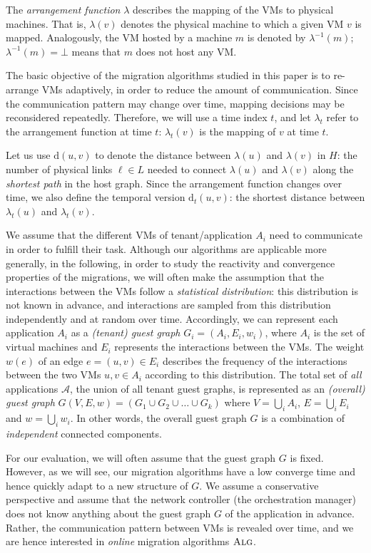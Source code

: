 \documentclass[conference]{IEEEtran}
\newcommand{\dist}{\text{d}}
\begin{document}
The \emph{arrangement function} $\lambda$ describes the mapping of the VMs to physical machines. That is, $\lambda(v)$ denotes the physical machine to which a given VM $v$ is mapped. Analogously, the VM hosted by a machine $m$ is denoted by $\lambda^{-1}(m)$; $\lambda^{-1}(m)=\bot$ means that $m$ does not host any VM.

The basic objective of the migration algorithms studied in this paper is to re-arrange VMs adaptively, in order to reduce the amount of communication. Since the communication pattern may change over time, mapping decisions may be reconsidered repeatedly. Therefore, we will use a time index $t$, and let $\lambda_{t}$ refer to the arrangement function at time $t$: $\lambda_t(v)$ is the mapping of $v$ at time $t$.

Let us use $\dist(u,v)$ to denote the distance between $\lambda(u)$ and $\lambda(v)$ in $H$: the number of physical links $\ell \in L$ needed to connect $\lambda(u)$ and $\lambda(v)$ along the \emph{shortest path} in the host graph. Since the arrangement function changes over time, we also define the temporal version $\dist_{t}(u,v)$: the shortest distance between $\lambda_{t}(u)$ and $\lambda_{t}(v)$.

We assume that the different VMs of tenant/application $A_{i}$ need to communicate in order to fulfill their task. Although our algorithms
are applicable more generally, in the following, in order to study the reactivity and convergence properties of the migrations,
we will often make the assumption that the interactions between the VMs follow a \emph{statistical distribution}:
this distribution is not known in advance, and interactions are sampled from this distribution independently and at random over time.
Accordingly, we can represent each application $A_{i}$ as a \emph{(tenant) guest graph} $G_{i}=(A_{i},E_{i},w_{i})$,
where $A_{i}$ is the set of virtual machines and
$E_i$ represents the interactions between the VMs. The weight $w(e)$ of an edge $e=(u,v) \in E_i$ describes the
frequency of the interactions between the two VMs $u,v \in A_{i}$ according to this distribution.
The total set of \emph{all} applications $\mathcal{A}$, the union of all tenant guest graphs, is represented as an \emph{(overall) guest graph} $G(V,E, w) = (G_{1} \cup G_{2} \cup \ldots \cup G_{k})$
where $V=\bigcup_i A_i$, $E=\bigcup_i E_i$ and $w=\bigcup_i w_i$.
In other words, the overall guest graph $G$ is a combination of \emph{independent} connected components.

For our evaluation, we will often assume that the guest graph $G$ is fixed. However, as we will see,
our migration algorithms have a low converge time and hence quickly adapt to a new structure of $G$.
We assume a conservative perspective and assume that the network controller (the orchestration manager) does not know anything
about the guest graph $G$ of the application in advance.
Rather, the communication pattern between VMs is revealed over time, and we are hence interested in \emph{online} migration algorithms $\textsc{Alg}$.
\end{document}

